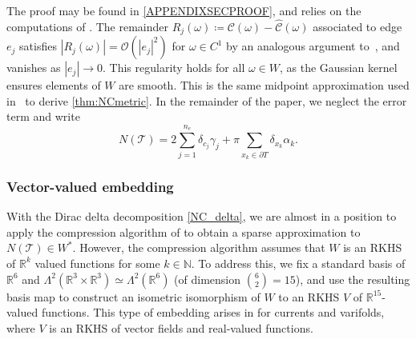 \documentclass[sn-mathphys-num]{sn-jnl}%
\theoremstyle{thmstyleone}%
\theoremstyle{thmstyletwo}%
\theoremstyle{thmstylethree}%
\numberwithin{remark}{section}
\numberwithin{definition}{section}
\numberwithin{equation}{section}
\numberwithin{theorem}{section}
\newcommand{\N}{\ensuremath{\mathbb{N}}}%
\newcommand{\R}{\ensuremath{\mathbb{R}}}%
\begin{document}
The proof may be found in \cref{APPENDIXSECPROOF}, and relies on the computations of \cite{NCpaper,NCThesis}. 
The remainder $R_j(\omega)\coloneq \mathcal{C}(\omega) - \hat{\mathcal{C}}(\omega)$ 
associated to edge $e_j$ satisfies $|R_j(\omega)| = \mathcal{O}(|e_j|^2)$ 
for $\omega \in C^1$ by an analogous argument 
to~\cite[Proposition~1]{Kaltenmark2017AGF}, and vanishes as 
$|e_j| \to 0$. This regularity holds for all $\omega \in W$, 
as the Gaussian kernel ensures elements of $W$ are smooth. 
This is the same midpoint approximation used 
in~\cite{NCpaper} to derive \cref{thm:NCmetric}. In the remainder of the paper, we neglect the error term and write
\begin{equation}\label{NC_delta}
N(\mathcal T)=2\sum_{j=1}^{n_e}\delta_{c_j} \gamma_j + \pi\sum_{x_k\in\partial T}\delta_{x_k}\alpha_k.
\end{equation}




\subsubsection{Vector-valued embedding}
With the Dirac delta decomposition \cref{NC_delta}, we are almost in a position to apply the compression algorithm of \cite{SparseNystromCurrVar} to obtain a sparse approximation to $N(\mathcal{T}) \in W^{*}$. However, the compression algorithm assumes that $W$ is an RKHS of $\R^{k}$ valued functions for some $k\in \N$. To address this, we fix a standard basis of $\R^{6}$ and $\Lambda^{2}(\R^{3}\times \R^{3}) \simeq \Lambda^{2}(\R^{6})$ (of dimension $\binom{6}{2}= 15$), and use the resulting basis map to construct an isometric isomorphism of $W$ to an RKHS $V$ of $\R^{15}$-valued functions. 
This type of embedding arises in \cite{FidelityMetrics} for currents and varifolds, where $V$ is an RKHS of vector fields and real-valued functions.
\end{document}
